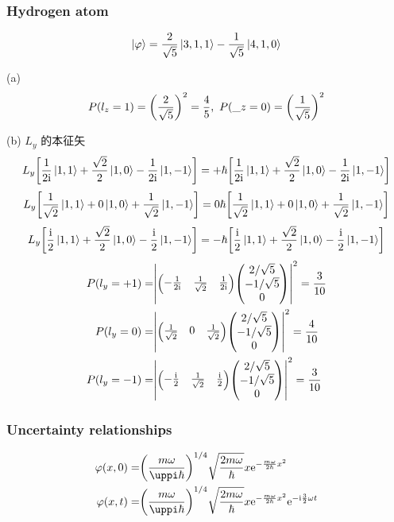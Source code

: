 \subsubsection{Hydrogen atom}

\[
\ket{\varphi} = \frac{2}{\sqrt{5}} \ket{3, 1, 1} - \frac{1}{\sqrt{5}} \ket{4, 1, 0}
\]

(a)
\[
P(l_z = 1) = \qty(\frac{2}{\sqrt{5}})^2 = \frac{4}{5},\ P(\_z = 0) = \qty(\frac{1}{\sqrt{5}})^2
\]


(b)
$L_y$ 的本征矢 \[
L_y \qty[\frac{1}{2 \mathrm{i}} \ket{1, 1} + \frac{\sqrt{2}}{2} \ket{1, 0} - \frac{1}{2 \mathrm{i}} \ket{1, -1}] = + \hbar \qty[\frac{1}{2 \mathrm{i}} \ket{1, 1} + \frac{\sqrt{2}}{2} \ket{1, 0} - \frac{1}{2 \mathrm{i}} \ket{1, -1}]
\] \[
L_y \qty[\frac{1}{\sqrt{2}} \ket{1, 1} + 0 \ket{1, 0} + \frac{1}{\sqrt{2}} \ket{1, -1}] = 0 \hbar \qty[\frac{1}{\sqrt{2}} \ket{1, 1} + 0 \ket{1, 0} + \frac{1}{\sqrt{2}} \ket{1, -1}]
\] \[
L_y \qty[\frac{\mathrm{i}}{2} \ket{1, 1} + \frac{\sqrt{2}}{2} \ket{1, 0} - \frac{\mathrm{i}}{2} \ket{1, -1}] = - \hbar \qty[\frac{\mathrm{i}}{2} \ket{1, 1} + \frac{\sqrt{2}}{2} \ket{1, 0} - \frac{\mathrm{i}}{2} \ket{1, -1}]
\] \begin{align*}
    P(l_y = + 1) = & \qty|\mqty(- \frac{1}{2 \rmi} & \frac{1}{\sqrt{2}} & \frac{1}{2 \rmi}) \mqty(2 / \sqrt{5} \\ - 1 /\sqrt{5} \\ 0)|^2 = \frac{3}{10}\\
    P(l_y = 0) = & \qty|\mqty(\frac{1}{\sqrt{2}} & 0 & \frac{1}{\sqrt{2}}) \mqty(2 / \sqrt{5} \\ - 1 /\sqrt{5} \\ 0)|^2 = \frac{4}{10}\\
    P(l_y = - 1) = & \qty|\mqty(- \frac{\rmi}{2} & \frac{1}{\sqrt{2}} & \frac{\rmi}{2}) \mqty(2 / \sqrt{5} \\ - 1 /\sqrt{5} \\ 0)|^2 = \frac{3}{10}
\end{align*}

\subsubsection{Uncertainty relationships}

\begin{align*}
    \varphi(x, 0) = & \qty(\frac{m \omega}{\uppi \hbar})^{1 / 4} \sqrt{\frac{2 m \omega}{\hbar}} x \rme^{- \frac{m \omega}{2 \hbar} x^2}\\
    \varphi(x, t) = & \qty(\frac{m \omega}{\uppi \hbar})^{1 / 4} \sqrt{\frac{2 m \omega}{\hbar}} x \rme^{- \frac{m \omega}{2 \hbar} x^2} \rme^{- \rmi \frac{3}{2} \omega t}
\end{align*}

